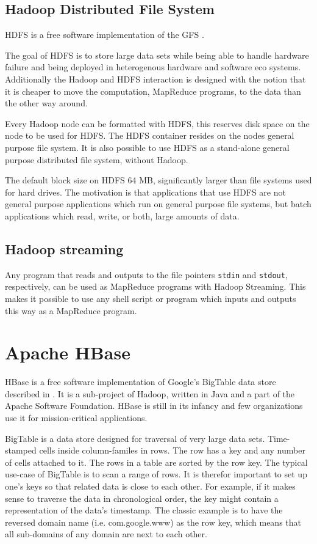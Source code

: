 \documentclass[a4paper,10pt]{book}
\begin{document}
\subsection{Hadoop Distributed File System}

HDFS is a free software implementation of the GFS \cite{gfs}.

The goal of HDFS is to store large data sets while being able to handle
hardware failure and being deployed in heterogenous hardware and software
eco systems. Additionally the Hadoop and HDFS interaction is designed with
the notion that it is cheaper to move the computation, MapReduce programs,
to the data than the other way around.

Every Hadoop node can be formatted with HDFS, this reserves disk space on
the node to be used for HDFS. The HDFS container resides on the nodes
general purpose file system. It is also possible to use HDFS as a
stand-alone general purpose distributed file system, without Hadoop.

The default block size on HDFS 64 MB, significantly larger than
file systems used for hard drives. The motivation is that applications
that use HDFS are not general purpose applications which run on general
purpose file systems, but batch applications which read, write, or both,
large amounts of data.


\subsection{Hadoop streaming}

Any program that reads and outputs to the file pointers \texttt{stdin} and
\texttt{stdout}, respectively, can be used as MapReduce programs with
Hadoop Streaming. This makes it possible to use any shell script or
program which inputs and outputs this way as a MapReduce program.


\section{Apache HBase}

HBase is a free software implementation of Google's BigTable data store
described in \cite{bigtable}. It is a sub-project of Hadoop, written in
Java and a part of the Apache Software Foundation. HBase is still in its
infancy and few organizations use it for mission-critical applications.
\cite{hbase}

BigTable is a data store designed for traversal of very large data sets.
Time-stamped cells inside column-familes in rows. The row has a key and
any number of cells attached to it. The rows in a table are sorted by the
row key.  The typical use-case of BigTable is to scan a range of rows. It
is therefor important to set up one's keys so that related data is close
to each other. For example, if it makes sense to traverse the data in
chronological order, the key might contain a representation of the data's
timestamp. The classic example is to have the reversed domain name (i.e.
com.google.www) as the row key, which means that all sub-domains of any
domain are next to each other.
\end{document}
